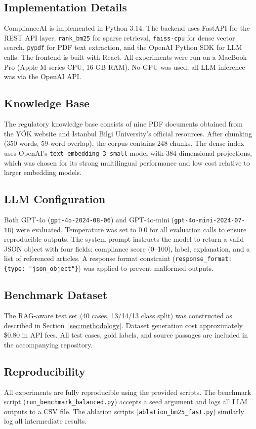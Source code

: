 \subsection{Implementation Details}

ComplianceAI is implemented in Python 3.14. The backend uses FastAPI for the REST API layer, \texttt{rank\_bm25} for sparse retrieval, \texttt{faiss-cpu} for dense vector search, \texttt{pypdf} for PDF text extraction, and the OpenAI Python SDK for LLM calls. The frontend is built with React. All experiments were run on a MacBook Pro (Apple M-series CPU, 16 GB RAM). No GPU was used; all LLM inference was via the OpenAI API.

\subsection{Knowledge Base}

The regulatory knowledge base consists of nine PDF documents obtained from the YÖK website and Istanbul Bilgi University's official resources. After chunking (350 words, 59-word overlap), the corpus contains 248 chunks. The dense index uses OpenAI's \texttt{text-embedding-3-small} model with 384-dimensional projections, which was chosen for its strong multilingual performance and low cost relative to larger embedding models.

\subsection{LLM Configuration}

Both GPT-4o (\texttt{gpt-4o-2024-08-06}) and GPT-4o-mini (\texttt{gpt-4o-mini-2024-07-18}) were evaluated. Temperature was set to 0.0 for all evaluation calls to ensure reproducible outputs. The system prompt instructs the model to return a valid JSON object with four fields: compliance score (0--100), label, explanation, and a list of referenced articles. A response format constraint (\texttt{response\_format: \{type: "json\_object"\}}) was applied to prevent malformed outputs.

\subsection{Benchmark Dataset}

The RAG-aware test set (40 cases, 13/14/13 class split) was constructed as described in Section~\ref{sec:methodology}. Dataset generation cost approximately \$0.80 in API fees. All test cases, gold labels, and source passages are included in the accompanying repository.

\subsection{Reproducibility}

All experiments are fully reproducible using the provided scripts. The benchmark script (\texttt{run\_benchmark\_balanced.py}) accepts a seed argument and logs all LLM outputs to a CSV file. The ablation scripts (\texttt{ablation\_bm25\_fast.py}) similarly log all intermediate results.
